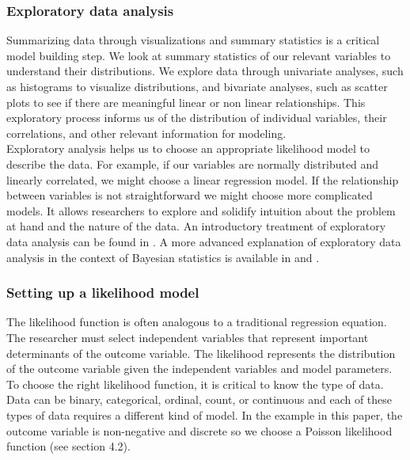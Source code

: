 \documentclass{article}
\begin{document}
\subsubsection{Exploratory data analysis}
Summarizing data through visualizations and summary statistics is a critical model building step. We look at summary statistics of our relevant variables to understand their distributions. We explore data through univariate analyses, such as histograms to visualize distributions, and bivariate analyses, such as scatter plots to see if there are meaningful linear or non linear relationships. This exploratory process informs us of the distribution of individual variables, their correlations, and other relevant information for modeling. \\
Exploratory analysis helps us to choose an appropriate likelihood model to describe the data. For example, if our variables are normally distributed and linearly correlated, we might choose a linear regression model. If the relationship between variables is not straightforward we might choose more complicated models.  It allows researchers to explore and solidify intuition about the problem at hand and the nature of the data. An introductory treatment of exploratory data analysis can be found in . A more advanced explanation of exploratory data analysis in the context of Bayesian statistics is available in  and .


\subsubsection{Setting up a likelihood model}
The likelihood function is often analogous to a traditional regression equation. The researcher must select independent variables that represent important determinants of the outcome variable. The likelihood represents the distribution of the outcome variable given the independent variables and model parameters. To choose the right likelihood function, it is critical to know the type of data. Data can be binary, categorical, ordinal, count, or continuous and each of these types of data requires a different kind of model. In the example in this paper, the outcome variable is non-negative and discrete so we choose a Poisson likelihood function (see section 4.2). 
 
\end{document}
